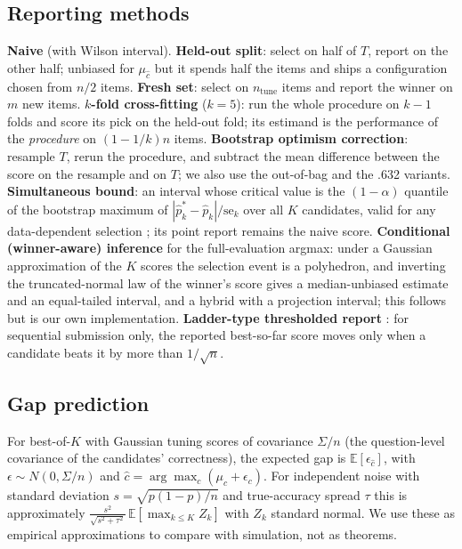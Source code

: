 \subsection{Reporting methods}
\textbf{Naive} (with Wilson interval). \textbf{Held-out split}: select on half of $T$, report on the other half; unbiased for $\mu_{\hat c}$ but it spends half the items and ships a configuration chosen from $n/2$ items. \textbf{Fresh set}: select on $n_{\text{tune}}$ items and report the winner on $m$ new items. \textbf{$k$-fold cross-fitting} ($k=5$): run the whole procedure on $k-1$ folds and score its pick on the held-out fold; its estimand is the performance of the \emph{procedure} on $(1-1/k)n$ items. \textbf{Bootstrap optimism correction}: resample $T$, rerun the procedure, and subtract the mean difference between the score on the resample and on $T$; we also use the out-of-bag and the .632 variants. \textbf{Simultaneous bound}: an interval whose critical value is the $(1-\alpha)$ quantile of the bootstrap maximum of $|\hat p^*_k-\hat p_k|/\mathrm{se}_k$ over all $K$ candidates, valid for any data-dependent selection \citep{chernozhukov2013gaussian,berk2013valid}; its point report remains the naive score. \textbf{Conditional (winner-aware) inference} for the full-evaluation argmax: under a Gaussian approximation of the $K$ scores the selection event is a polyhedron, and inverting the truncated-normal law of the winner's score gives a median-unbiased estimate and an equal-tailed interval, and a hybrid with a projection interval; this follows \citet{andrews2024winners} but is our own implementation. \textbf{Ladder-type thresholded report} \citep{blum2015ladder}: for sequential submission only, the reported best-so-far score moves only when a candidate beats it by more than $1/\sqrt n$.

\subsection{Gap prediction}
For best-of-$K$ with Gaussian tuning scores of covariance $\Sigma/n$ (the question-level covariance of the candidates' correctness), the expected gap is $\mathbb E[\epsilon_{\hat c}]$, with $\epsilon\sim N(0,\Sigma/n)$ and $\hat c=\arg\max_c(\mu_c+\epsilon_c)$. For independent noise with standard deviation $s=\sqrt{p(1-p)/n}$ and true-accuracy spread $\tau$ this is approximately $\frac{s^2}{\sqrt{s^2+\tau^2}}\,\mathbb E[\max_{k\le K}Z_k]$ with $Z_k$ standard normal. We use these as empirical approximations to compare with simulation, not as theorems.

